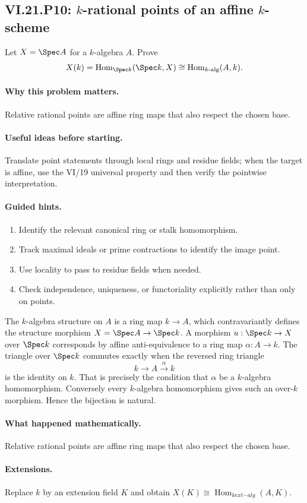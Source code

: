 \subsection*{VI.21.P10: $k$-rational points of an affine $k$-scheme}
\begin{problem}\label{prob:vi21-p10}
Let $X=\Spec A$ for a $k$-algebra $A$.  Prove
\[
X(k)=\operatorname{Hom}_{\Spec k}(\Spec k,X)
\cong\operatorname{Hom}_{k\text{-alg}}(A,k).
\]
\end{problem}

\ifdefined\FullProblemDossiers
\paragraph{Why this problem matters.}
Relative rational points are affine ring maps that also respect the chosen base.

\paragraph{Useful ideas before starting.}
Translate point statements through local rings and residue fields; when the target is affine, use the VI/19 universal property and then verify the pointwise interpretation.

\paragraph{Guided hints.}
\begin{enumerate}
\item Identify the relevant canonical ring or stalk homomorphism.
\item Track maximal ideals or prime contractions to identify the image point.
\item Use locality to pass to residue fields when needed.
\item Check independence, uniqueness, or functoriality explicitly rather than only on points.
\end{enumerate}

\begin{solution}
The $k$-algebra structure on $A$ is a ring map $k\to A$, which contravariantly defines the
structure morphism $X=\Spec A\to\Spec k$.  A morphism $u:\Spec k\to X$ over $\Spec k$ corresponds
by affine anti-equivalence to a ring map $\alpha:A\to k$.  The triangle over $\Spec k$ commutes
exactly when the reversed ring triangle
\[
k\longrightarrow A\xrightarrow{\alpha}k
\]
is the identity on $k$.  That is precisely the condition that $\alpha$ be a $k$-algebra
homomorphism.  Conversely every $k$-algebra homomorphism gives such an over-$k$ morphism.  Hence the
bijection is natural.
\end{solution}

\paragraph{What happened mathematically.}
Relative rational points are affine ring maps that also respect the chosen base.

\paragraph{Extensions.}
Replace $k$ by an extension field $K$ and obtain $X(K)\cong\operatorname{Hom}_{k	ext{-alg}}(A,K)$.
\fi
